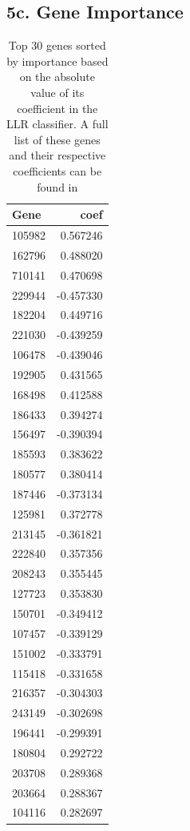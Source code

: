 \documentclass[twocolumn]{article}
\begin{document}
\subsection{5c. Gene Importance}
\begin{table}[H]
    \centering
    \begin{tabular}{lr}
    \toprule
    Gene & coef \\
    \midrule
    105982 & 0.567246 \\
    162796 & 0.488020 \\
    710141 & 0.470698 \\
    229944 & -0.457330 \\
    182204 & 0.449716 \\
    221030 & -0.439259 \\
    106478 & -0.439046 \\
    192905 & 0.431565 \\
    168498 & 0.412588 \\
    186433 & 0.394274 \\
    156497 & -0.390394 \\
    185593 & 0.383622 \\
    180577 & 0.380414 \\
    187446 & -0.373134 \\
    125981 & 0.372778 \\
    213145 & -0.361821 \\
    222840 & 0.357356 \\
    208243 & 0.355445 \\
    127723 & 0.353830 \\
    150701 & -0.349412 \\
    107457 & -0.339129 \\
    151002 & -0.333791 \\
    115418 & -0.331658 \\
    216357 & -0.304303 \\
    243149 & -0.302698 \\
    196441 & -0.299391 \\
    180804 & 0.292722 \\
    203708 & 0.289368 \\
    203664 & 0.288367 \\
    104116 & 0.282697 \\
    \bottomrule
    \end{tabular}
    \caption{Top 30 genes sorted by importance based on the absolute value of its coefficient in the LLR classifier. A full list of these genes and their respective coefficients can be found in }
    \label{tab:genes-lasso}
\end{table}
\end{document}
